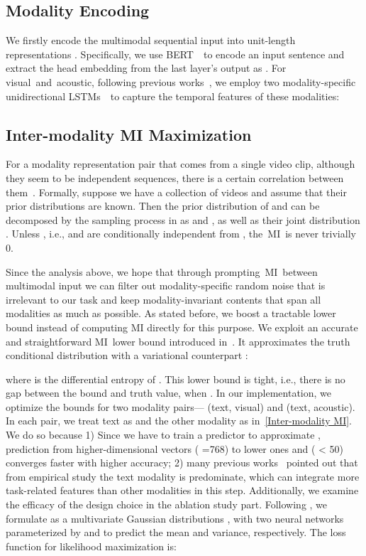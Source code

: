 \documentclass[11pt]{article}
\newcommand{\mv}{visual}
\newcommand{\ma}{acoustic}
\newcommand{\MI}{MI}
\begin{document}
\subsection{Modality Encoding}
We firstly encode the multimodal sequential input  into unit-length representations . 
Specifically, we use BERT~\citep{devlin2019bert}~to encode an input sentence and extract the head embedding from the last layer's output as . 
For \mv~and~\ma, following previous works~\citep{hazarika2020misa, yu2021learning}, we employ two modality-specific unidirectional LSTMs~\citep{hochreiter1997long}~to capture the temporal features of these modalities:



\subsection{Inter-modality MI Maximization}
For a modality representation pair  that comes from a single video clip, although they seem to be independent sequences, there is a certain correlation between them~\cite{arandjelovic2017look}.
Formally, suppose we have a collection of videos  and assume that their prior distributions are known. 
Then the prior distribution of  and  can be decomposed by the sampling process in  as  and , as well as their joint distribution . Unless , i.e.,  and  are conditionally independent from , the~\MI~is never trivially 0. 
\par
Since the analysis above, we hope that through prompting~\MI~between multimodal input we can filter out modality-specific random noise that is irrelevant to our task and keep modality-invariant contents that span all modalities as much as possible.
As stated before, we boost a tractable lower bound instead of computing MI directly for this purpose.
We exploit an accurate and straightforward \MI~lower bound introduced in~\citet{agakov2004algorithm}.
It approximates the truth conditional distribution  with a variational counterpart :

where  is the differential entropy of . This lower bound is tight, i.e., there is no gap between the bound and truth value, when .
In our implementation, we optimize the bounds for two modality pairs--- (text, visual) and (text, acoustic). 
In each pair, we treat text as  and the other modality as  in~\eqref{Inter-modality MI}. 
We do so because 1) Since we have to train a predictor  to approximate , prediction from higher-dimensional vectors  ( =768) to lower ones  and  ( < 50) converges faster with higher accuracy; 2) many previous works~\citep{tsai2019multimodal,hazarika2020misa} pointed out that from empirical study the text modality is predominate, which can integrate more task-related features than other modalities in this step.
Additionally, we examine the efficacy of the design choice in the ablation study part.
Following \citet{cheng2020club}, we formulate  as a multivariate Gaussian distributions , with two neural networks parameterized by  and  to predict the mean and variance, respectively. 
The loss function for likelihood maximization is:
\end{document}
